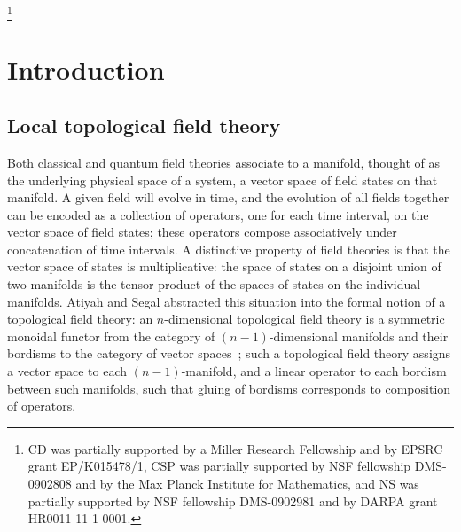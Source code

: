 \documentclass{amsart}
\begin{document}
\thanks{CD was partially supported by a Miller Research Fellowship and by EPSRC grant EP/K015478/1, CSP was partially supported by NSF fellowship DMS-0902808 and by the Max Planck Institute for Mathematics, and NS was partially supported by NSF fellowship DMS-0902981 and by DARPA grant HR0011-11-1-0001.}

\vspace*{-25pt}

\maketitle	

\vspace*{-15pt}

\setcounter{tocdepth}{2}
\tableofcontents






\section{Introduction}

\subsection{Local topological field theory}

Both classical and quantum field theories associate to a manifold, thought of as the underlying physical space of a system, a vector space of field states on that manifold.  A given field will evolve in time, and the evolution of all fields together can be encoded as a collection of operators, one for each time interval, on the vector space of field states; these operators compose associatively under concatenation of time intervals.  A distinctive property of field theories is that the vector space of states is multiplicative: the space of states on a disjoint union of two manifolds is the tensor product of the spaces of states on the individual manifolds.  Atiyah and Segal abstracted this situation into the formal notion of a topological field theory: an $n$-dimensional topological field theory is a symmetric monoidal functor from the category of $(n-1)$-dimensional manifolds and their bordisms to the category of vector spaces~\cite{MR1001453,Segal}; such a topological field theory assigns a vector space to each $(n-1)$-manifold, and a linear operator to each bordism between such manifolds, such that gluing of bordisms corresponds to composition of operators.
\end{document}
